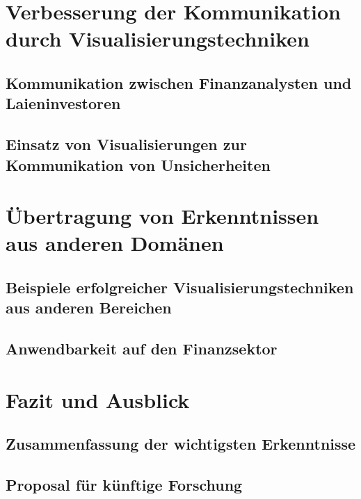 \section{Verbesserung der Kommunikation durch Visualisierungstechniken}
\subsection{Kommunikation zwischen Finanzanalysten und Laieninvestoren}
\cite{Joslyn2021}
\subsection{Einsatz von Visualisierungen zur Kommunikation von Unsicherheiten}

\section{Übertragung von Erkenntnissen aus anderen Domänen}
\subsection{Beispiele erfolgreicher Visualisierungstechniken aus anderen Bereichen}
\cite{Boller2010}
\subsection{Anwendbarkeit auf den Finanzsektor}

\section{Fazit und Ausblick}
\subsection{Zusammenfassung der wichtigsten Erkenntnisse}
\subsection{Proposal für künftige Forschung}

